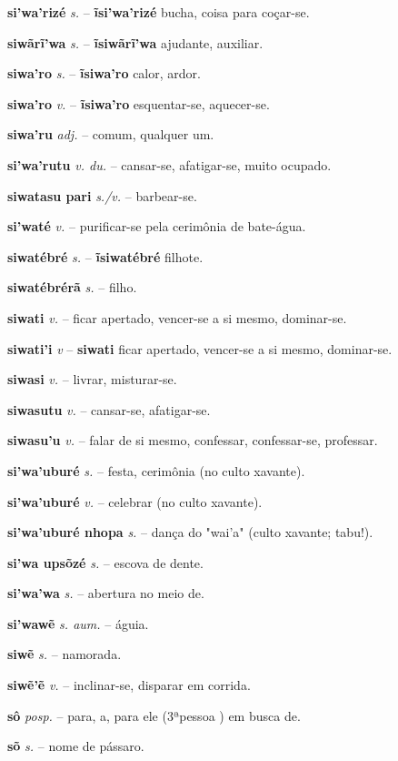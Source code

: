 \textbf{si'wa'rizé} \textit{s.} -- \textbf{ĩsi'wa'rizé} bucha, coisa para coçar-se.

\textbf{siwãrĩ'wa} \textit{s.} -- \textbf{ĩsiwãrĩ'wa} ajudante, auxiliar.

\textbf{siwa'ro} \textit{s.} -- \textbf{ĩsiwa'ro} calor, ardor.

\textbf{siwa'ro} \textit{v.} -- \textbf{ĩsiwa'ro} esquentar-se, aquecer-se.

\textbf{siwa'ru} \textit{adj.} -- comum, qualquer um.

\textbf{si'wa'rutu} \textit{v. du.} -- cansar-se, afatigar-se, muito ocupado.

\textbf{siwatasu pari} \textit{s./v.} -- barbear-se.

\textbf{si'waté} \textit{v.} -- purificar-se pela cerimônia de bate-água.

\textbf{siwatébré} \textit{s.} -- \textbf{ĩsiwatébré} filhote.

\textbf{siwatébrérã} \textit{s.} -- filho.

\textbf{siwati} \textit{v.} -- ficar apertado, vencer-se a si mesmo, dominar-se.

\textbf{siwati'i} \textit{v} -- \textbf{siwati} ficar apertado, vencer-se a si mesmo, dominar-se.

\textbf{siwasi} \textit{v.} -- livrar, misturar-se.

\textbf{siwasutu} \textit{v.} -- cansar-se, afatigar-se.

\textbf{siwasu'u} \textit{v.} -- falar de si mesmo, confessar, confessar-se, professar.

\textbf{si'wa'uburé} \textit{s.} -- festa, cerimônia (no culto xavante).

\textbf{si'wa'uburé} \textit{v.} -- celebrar (no culto xavante).

\textbf{si'wa'uburé nhopa} \textit{s.} -- dança do "wai'a" (culto xavante; tabu!).

\textbf{si'wa upsõzé} \textit{s.} -- escova de dente.

\textbf{si'wa'wa} \textit{s.} -- abertura no meio de.

\textbf{si'wawẽ} \textit{s. aum.} -- águia.

\textbf{siwẽ} \textit{s.} -- namorada.

\textbf{siwẽ'ẽ} \textit{v.} -- inclinar-se, disparar em corrida.

\textbf{sô} \textit{posp.} -- para, a, para ele (3ªpessoa ) em busca de.

\textbf{sõ} \textit{s.} -- nome de pássaro.

